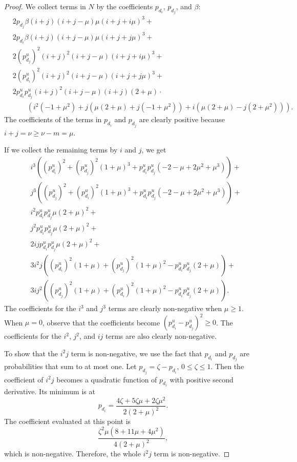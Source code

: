 \documentclass[prodmode,acmtissec]{acmsmall}
\begin{document}
\begin{proof}
We collect terms in $N$ by the coefficients $p_{d_i}$, $p_{d_j}$, and $\beta$:
\begin{align*}
&2 p_{d_j} \beta (i+j)(i+j-\mu ) \mu  (i+j+i \mu )^3 + \\
&2 p_{d_i} \beta (i+j) (i+j-\mu ) \mu  (i+j+j \mu )^3 +\\
&2 (p^u_{d_j})^2 (i+j)^2 (i+j-\mu )(i+j+i \mu )^3 +\\
&2 (p^u_{d_i})^2 (i+j)^2 (i+j-\mu )(i+j+j \mu )^3 +\\
&2 p^u_{d_i} p^u_{d_j} (i+j)^2 (i+j-\mu ) (i+j)(2+\mu )\cdot \\
&\qquad \left(i^2 \left(-1+\mu ^2\right)+j \left(\mu  (2+\mu )+j \left(-1+\mu ^2\right)\right)+i \left(\mu  (2+\mu )-j \left(2+\mu ^2\right)\right)\right).
\end{align*}
The coefficients of the terms in $p_{d_i}$ and $p_{d_j}$ are clearly positive because $i+j = \nu \ge \nu-m = \mu$.

If we collect the remaining terms by $i$ and $j$, we get
\begin{align*}
&i^3 \left((p^u_{d_i})^2+(p^u_{d_j})^2 (1+\mu )^3+p^u_{d_i} p^u_{d_j} \left(-2-\mu +2 \mu ^2+\mu ^3\right)\right) +\\
&j^3 \left((p^u_{d_j})^2+(p^u_{d_i})^2 (1+\mu )^3+p^u_{d_i} p^u_{d_j} \left(-2-\mu +2 \mu ^2+\mu ^3\right)\right) +\\
&i^2 p^u_{d_i} p^u_{d_j} \mu  (2+\mu )^2 +\\
&j^2 p^u_{d_i} p^u_{d_j} \mu  (2+\mu )^2 +\\
&2 i j p^u_{d_i} p^u_{d_j} \mu  (2+\mu )^2 +\\
&3 i^2 j \left((p^u_{d_i})^2 (1+\mu )+(p^u_{d_j})^2 (1+\mu )^2-p^u_{d_i} p^u_{d_j} (2+\mu )\right) +\\
&3 i j^2 \left((p^u_{d_j})^2 (1+\mu )+(p^u_{d_i})^2 (1+\mu )^2-p^u_{d_i} p^u_{d_j} (2+\mu )\right).
\end{align*}
The coefficients for the $i^3$ and $j^3$ terms are clearly non-negative when $\mu \ge 1$.  When $\mu=0$, observe that the coefficients become $(p^u_{d_i}-p^u_{d_j})^2\ge 0$.  The coefficients for the $i^2$, $j^2$, and $ij$ terms are also clearly non-negative.

To show that the $i^2 j$ term is non-negative, we use the fact that $p_{d_i}$ and $p_{d_j}$ are probabilities that sum to at most one.  Let $p_{d_j} = \zeta-p_{d_i}$, $0\le \zeta \le 1$.  Then the coefficient of $i^2 j$ becomes a quadratic function of $p_{d_i}$ with positive second derivative.  Its minimum is at
\begin{equation*}
p_{d_i} = \frac{4 \zeta +5 \zeta  \mu +2 \zeta  \mu ^2}{2 (2+\mu )^2}.
\end{equation*}
The coefficient evaluated at this point is
\begin{equation*}
\frac{\zeta ^2 \mu  \left(8+11 \mu +4 \mu ^2\right)}{4 (2+\mu )^2},
\end{equation*}
which is non-negative.  Therefore, the whole $i^2 j$ term is non-negative.


\end{proof}
\end{document}
